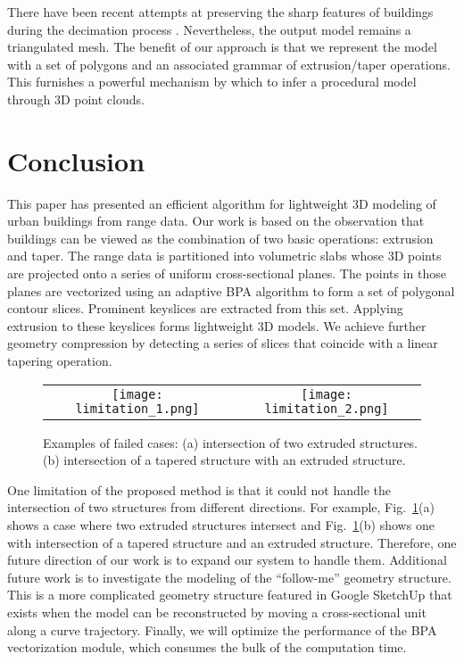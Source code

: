 \documentclass[10pt, conference, compsocconf]{IEEEtran}
\newcommand{\Figa}[1]{Fig.~\ref{fig:#1}(a)}
\newcommand{\Figb}[1]{Fig.~\ref{fig:#1}(b)}
\begin{document}
There have been recent attempts at preserving the sharp features of buildings
during the decimation process \cite{moser09}.
Nevertheless, the output model remains a triangulated mesh.
The benefit of our approach is that we represent the model with a set of
polygons and an associated grammar of extrusion/taper operations.
This furnishes a powerful mechanism by which to infer a procedural
model through 3D point clouds.

\section{Conclusion}

This paper has presented an efficient algorithm for lightweight 3D modeling
of urban buildings from range data.
Our work is based on the observation that buildings can be viewed as the
combination of two basic operations: extrusion and taper.
The range data is partitioned into volumetric slabs whose 3D points are
projected onto a series of uniform cross-sectional planes.
The points in those planes are vectorized using an adaptive BPA algorithm
to form a set of polygonal contour slices.
Prominent keyslices are extracted from this set.
Applying extrusion to these keyslices forms lightweight 3D models.
We achieve further geometry compression by detecting a series of
slices that coincide with a linear tapering operation.

\begin{figure} [htbp]
\begin{center}
\begin{tabular}{cc}
\texttt{[image: limitation\_1.png]} &
\texttt{[image: limitation\_2.png]}
\end{tabular}
\end{center}
\caption{Examples of failed cases:
      (a) intersection of two extruded structures.
      (b) intersection of a tapered structure with an extruded structure.}
\label{fig:ER_Lmt}
\end{figure}

One limitation of the proposed method is that it could not handle the
intersection of two structures from different directions.
For example, \Figa{ER_Lmt} shows a case where two extruded structures
intersect and \Figb{ER_Lmt} shows one with intersection of a tapered
structure and an extruded structure.
Therefore, one future direction of our work is to expand our system to
handle them.
Additional future work is to investigate the modeling of the ``follow-me''
geometry structure.
This is a more complicated geometry structure featured in Google SketchUp
that exists when the model can be reconstructed by moving a cross-sectional
unit along a curve trajectory.
Finally, we will optimize the performance of the BPA vectorization module,
which consumes the bulk of the computation time.



\end{document}
